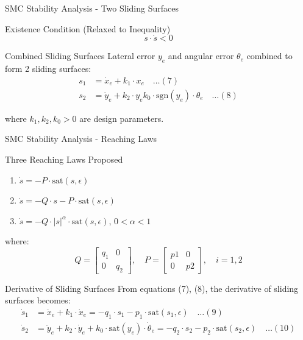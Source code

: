 \documentclass[10pt]{beamer}
\begin{document}
\begin{frame}{SMC Stability Analysis - Two Sliding Surfaces}
  \begin{block}{Existence Condition (Relaxed to Inequality)}
    $$s \cdot \dot{s} < 0$$
  \end{block}

  \begin{block}{Combined Sliding Surfaces}
    Lateral error $y_e$ and angular error $\theta_e$ combined to form 2 sliding surfaces:
    \begin{align}
      s_1 &= \dot{x}_e + k_1 \cdot x_e \quad \ldots (7) \\
      s_2 &= \dot{y}_e + k_2 \cdot y_e k_0 \cdot \text{sgn}(y_e) \cdot \theta_e \quad \ldots (8)
    \end{align}
  \end{block}

  where $k_1, k_2, k_0 > 0$ are design parameters.
\end{frame}

\begin{frame}{SMC Stability Analysis - Reaching Laws}
  \begin{block}{Three Reaching Laws Proposed}
    \begin{enumerate}
      \item $\dot{s} = -P \cdot \text{sat}(s, \epsilon)$
      \item $\dot{s} = -Q \cdot s - P \cdot \text{sat}(s, \epsilon)$
      \item $\dot{s} = -Q \cdot |s|^\alpha \cdot \text{sat}(s, \epsilon)$, \quad $0 < \alpha < 1$
    \end{enumerate}
  \end{block}

  where:
  $$Q = \begin{bmatrix} q_1 & 0 \\ 0 & q_2 \end{bmatrix}, \quad P = \begin{bmatrix} p1 & 0 \\ 0 & p2 \end{bmatrix}, \quad i = 1,2$$

  \vspace{0.3cm}

  \begin{block}{Derivative of Sliding Surfaces}
    From equations (7), (8), the derivative of sliding surfaces becomes:
    \begin{align}
      \dot{s}_1 &= \ddot{x}_e + k_1 \cdot \dot{x}_e = -q_1 \cdot s_1 - p_1 \cdot \text{sat}(s_1, \epsilon) \quad \ldots (9) \\
      \dot{s}_2 &= \ddot{y}_e + k_2 \cdot \dot{y}_e + k_0 \cdot \text{sat}(y_e) \cdot \dot{\theta}_e = -q_2 \cdot s_2 - p_2 \cdot \text{sat}(s_2, \epsilon) \quad \ldots (10)
    \end{align}
  \end{block}
\end{frame}
\end{document}
